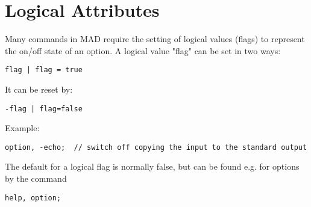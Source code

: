 
\section{Logical Attributes}
\label{sec:logical}

Many commands in MAD require the setting of logical values (flags) to
represent the on/off state of an option. A logical value "flag" can be
set in two ways:  
\begin{verbatim}
flag | flag = true
\end{verbatim} 

It can be reset by: 
\begin{verbatim}
-flag | flag=false
\end{verbatim} 

Example: 
\begin{verbatim}
option, -echo;  // switch off copying the input to the standard output
\end{verbatim} 

The default for a logical flag is normally false, but can be found e.g. for options by the command  
\begin{verbatim}
help, option;
\end{verbatim}


